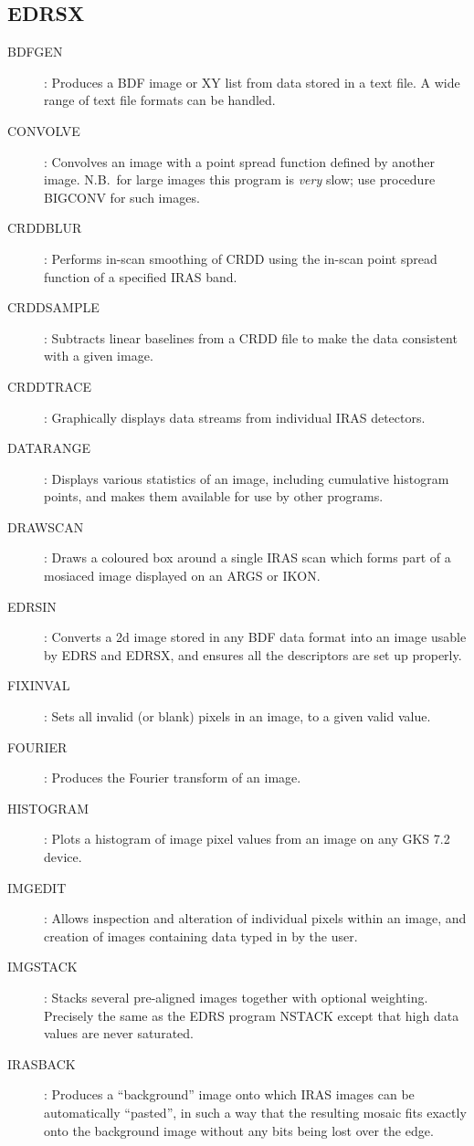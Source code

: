 \subsection {EDRSX}
\begin{description}
\item[BDFGEN]: Produces a BDF image or XY list from data stored in a text file.
A wide range of text file formats can be handled.
\item[CONVOLVE]: Convolves an image with a point spread function defined by
another image.
N.B.\ for large images this program is {\em very} slow; use procedure BIGCONV
for such images.
\item[CRDDBLUR]: Performs in-scan smoothing of CRDD using the in-scan
point spread function of a specified IRAS band.
\item[CRDDSAMPLE]: Subtracts linear baselines from a CRDD file to make the
data consistent with a given image.
\item[CRDDTRACE]: Graphically displays data streams from individual IRAS
detectors.
\item[DATARANGE]: Displays various statistics of an image, including cumulative
histogram points, and makes them available for use by other programs.
\item[DRAWSCAN]: Draws a coloured box around a single IRAS scan which forms
part of a mosiaced image displayed on an ARGS or IKON.
\item[EDRSIN]: Converts a 2d image stored in any BDF data format into an image
usable by EDRS and EDRSX, and ensures all the descriptors are set up properly.
\item[FIXINVAL]: Sets all invalid (or blank) pixels in an image, to a given
valid value.
\item[FOURIER]: Produces the Fourier transform of an image.
\item[HISTOGRAM]: Plots a histogram of image pixel values from an image on any
GKS 7.2 device.
\item[IMGEDIT]: Allows inspection and alteration of individual pixels within
an image, and creation of images containing data typed in by the user.
\item[IMGSTACK]: Stacks several pre-aligned images together with optional
weighting.
Precisely the same as the EDRS program NSTACK except that high data values are
never saturated.
\item[IRASBACK]: Produces a ``background'' image onto which IRAS images can be
automatically ``pasted'', in such a way that the resulting mosaic fits exactly
onto the background image without any bits being lost over the edge.

\end{description}
